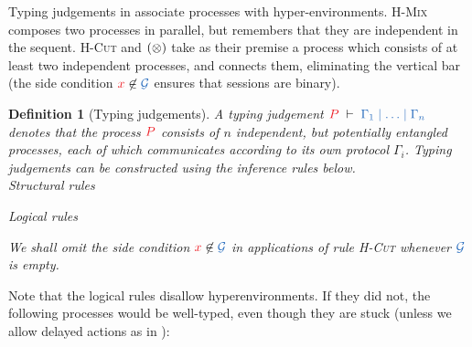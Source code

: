 \documentclass[copyright,creativecommons]{eptcs}
\newtheorem{definition}[lemma]{Definition}
\begin{document}
Typing judgements in \hcp associate processes with hyper-environments. \textsc{H-Mix} composes two processes in parallel, but remembers that they are independent in the sequent. \textsc{H-Cut} and $(\otimes)$ take as their premise a process which consists of at least two independent processes, and connects them, eliminating the vertical bar (the side condition $\tm{x} \not\in \ty{\mathcal{G}}$ ensures that sessions are binary). 
\begin{definition}[Typing judgements]\label{def:hcp}
  A typing judgement $\seq[P]{\Gamma_1 \hsep \dots \hsep \Gamma_n}$ denotes that the process $\tm{P}$ consists of $n$ independent, but potentially entangled processes, each of which communicates according to its own protocol $\Gamma_i$. 
  Typing judgements can be constructed using the inference rules below. 
  \\[1\baselineskip]
  {Structural rules} %
  \begin{center}
    \hcpInfAx
    \hcpInfCut
  \end{center}
  \begin{center}
    \hcpInfMix
    \hcpInfHalt
  \end{center}
  {Logical rules} %
  \begin{center}
    \hcpInfBoundTens
    \hcpInfParr
  \end{center}
  \begin{center}
    \hcpInfOne
    \hcpInfBot
  \end{center}
  \begin{center}
  \end{center}
  \begin{center}
    \hcpInfWith
  \end{center}
  \begin{center}
    \hcpInfNil
    \hcpInfTop
  \end{center}
We shall omit the side condition $\tm{x} \not\in \ty{\mathcal{G}}$ in applications of rule \textsc{H-Cut} whenever $\ty{\mathcal{G}}$ is empty.
\end{definition}
Note that the logical rules disallow hyperenvironments. If they did not, the following processes would be well-typed, even though they are stuck (unless we allow delayed actions as in \dhcp):
\end{document}
